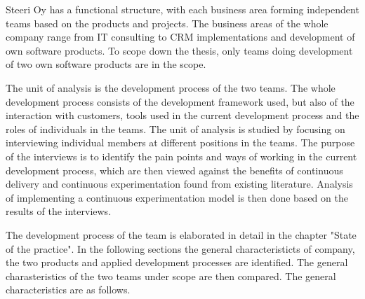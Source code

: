 \documentclass[english, grading]{tktltiki2}
\theoremstyle{definition}
\theoremstyle{remark}
\begin{document}
Steeri Oy has a functional structure, with each business area forming independent teams based on the products and projects. The business areas of the whole company range from IT consulting to CRM implementations and development of own software products. To scope down the thesis, only teams doing development of two own software products are in the scope.

The unit of analysis is the development process of the two teams. The whole development process consists of the development framework used, but also of the interaction with customers, tools used in the current development process and the roles of individuals in the teams. The unit of analysis is studied by focusing on interviewing individual members at different positions in the teams. The purpose of the interviews is to identify the pain points and ways of working in the current development process, which are then viewed against the benefits of continuous delivery and continuous experimentation found from existing literature. Analysis of implementing a continuous experimentation model is then done based on the results of the interviews.  


The development process of the team is elaborated in detail in the chapter "State of the practice". In the following sections the general characteristicts of company, the two products and applied development processes are identified. The general charasteristics of the two teams under scope are then compared. The general characteristics are as follows. 
\end{document}
